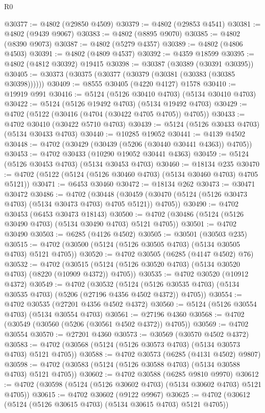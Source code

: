 \begin{lexlean}{R0}
\begin{coremodule}
@30377 := @4802 (@29850 @4509)
@30379 := @4802 (@29853 @4541)
@30381 := @4802 (@9439 @9067)
@30383 := @4802 (@8895 @9070)
@30385 := @4802 (@8390 @9073)
@30387 := @4802 (@5279 @4357)
@30389 := @4802 (@4806 @4503)
@30391 := @4802 (@4809 @4537)
@30392 := @4359 @18599
@30395 := @4802 (@4812 @30392) @19415
@30398 := @30387 (@30389 (@30391 @30395))
@30405 := @30373 (@30375 (@30377 (@30379 (@30381 (@30383 (@30385 @30398))))))
@30409 := @8555 @30405 (@4220 @4127) @1578
@30410 := @19919 @991
@30416 := @5124 (@5126 @30410 @4703) (@5134 @30410 @4703)
@30422 := @5124 (@5126 @19492 @4703) (@5134 @19492 @4703)
@30429 := @4702 (@5122 (@30416 (@4704 (@30422 @4705 @4705)) @4705))
@30433 := @4702 @30410 (@30422 @5710 @4703)
@30439 := @5124 (@5126 @30433 @4703) (@5134 @30433 @4703)
@30440 := @10285 @19052
@30441 := @4139 @4502
@30448 := @4702 (@30429 (@30439 (@5206 (@30440 @30441 @4363)) @4705))
@30453 := @4702 @30433 (@10290 @19052 @30441 @4363)
@30459 := @5124 (@5126 @30453 @4703) (@5134 @30453 @4703)
@30460 := @18134 @235
@30470 := @4702 (@5122 (@5124 (@5126 @30460 @4703) (@5134 @30460 @4703) @4705 @5121))
@30471 := @6453 @30460
@30472 := @18134 @262
@30473 := @30471 @30472
@30486 := @4702
    (@30448 (@30459 (@30470 (@5124 (@5126 @30473 @4703) (@5134 @30473 @4703) @4705 @5121)) @4705))
@30490 := @4702 @30453 (@6453 @30473 @18143)
@30500 := @4702 (@30486 (@5124 (@5126 @30490 @4703) (@5134 @30490 @4703) @5121 @4705))
@30501 := @4702 @30490
@30503 := @6285 (@4126 @4502)
@30505 := @30501 (@30503 @235)
@30515 := @4702 (@30500 (@5124 (@5126 @30505 @4703) (@5134 @30505 @4703) @5121 @4705))
@30520 := @4702 @30505 (@6285 (@4147 @4502) @76)
@30532 := @4702
    (@30515 (@5124 (@5126 @30520 @4703) (@5134 @30520 @4703) (@8220 (@10909 @4372)) @4705))
@30535 := @4702 @30520 (@10912 @4372)
@30549 := @4702
    (@30532
      (@5124 (@5126 @30535 @4703) (@5134 @30535 @4703) (@5206 (@27196 @4356 @4502 @4372)) @4705))
@30554 := @4702 @30535 (@27201 @4356 @4502 @4372)
@30560 := @5124 (@5126 @30554 @4703) (@5134 @30554 @4703)
@30561 := @27196 @4360
@30568 := @4702 (@30549 (@30560 (@5206 (@30561 @4502 @4372)) @4705))
@30569 := @4702 @30554
@30570 := @27201 @4360
@30573 := @30569 (@30570 @4502 @4372)
@30583 := @4702 (@30568 (@5124 (@5126 @30573 @4703) (@5134 @30573 @4703) @5121 @4705))
@30588 := @4702 @30573 (@6285 (@4131 @4502) @9807)
@30598 := @4702 (@30583 (@5124 (@5126 @30588 @4703) (@5134 @30588 @4703) @5121 @4705))
@30602 := @4702 @30588 (@6285 @9810 @9970)
@30612 := @4702 (@30598 (@5124 (@5126 @30602 @4703) (@5134 @30602 @4703) @5121 @4705))
@30615 := @4702 @30602 (@9122 @9967)
@30625 := @4702 (@30612 (@5124 (@5126 @30615 @4703) (@5134 @30615 @4703) @5121 @4705))

\end{coremodule}
\end{lexlean}
